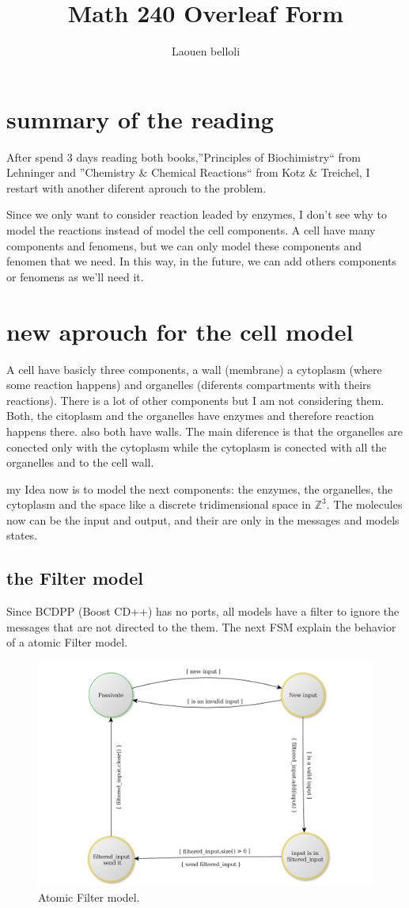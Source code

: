 \documentclass[12pt]{article}
\title{Math 240 Overleaf Form}
\author {Laouen belloli}
\begin{document}
\section*{summary of the reading}
After spend 3 days reading both books,''Principles of Biochimistry`` from Lehninger and ''Chemistry \& Chemical Reactions``  from Kotz \& Treichel, I restart with another diferent aprouch to the problem.

Since we only want to consider reaction leaded by enzymes, I don't see why to model the reactions instead of model the cell components. A cell have many components and fenomens, but we can only model these components and fenomen that we need. In this way, in the future, we can add others components or fenomens as we'll need it.


\section*{new aprouch for the cell model}  
A cell have basicly three components, a wall (membrane) a cytoplasm (where some reaction happens) and organelles (diferents compartments with theirs reactions).
There is a lot of other components but I am not considering them.
Both, the citoplasm and the organelles have enzymes and therefore reaction happens there. also both have walls. The main diference is that the organelles are conected only with the cytoplasm while the cytoplasm is conected with all the organelles and to the cell wall.

my Idea now is to model the next components: the enzymes, the organelles, the cytoplasm and the space like a discrete tridimensional space in $\mathbb{Z}^3$. The molecules now can be the input and output, and their are only in the messages and models states.

\newpage
\subsection*{the Filter model}
Since BCDPP (Boost CD++) has no ports, all models have a filter to ignore the messages that are not directed to the them.
The next FSM explain the behavior of a atomic Filter model.


\begin{figure}[h!]
 \centering
  \includegraphics[width=1\textwidth]{atomic-filter.jpg}
 \caption{Atomic Filter model.}
\end{figure}
\end{document}
